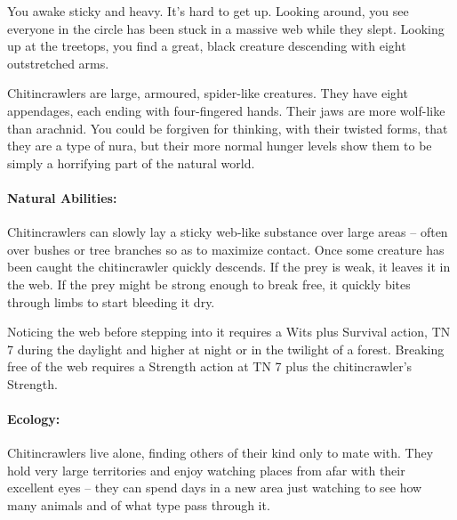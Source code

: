 \begin{multicols}{2}
\begin{itemize}
\end{itemize}


\label{chitincrawler}

\begin{boxtext}

You awake sticky and heavy.
It's hard to get up.
Looking around, you see everyone in the circle has been stuck in a massive web while they slept.
Looking up at the treetops, you find a great, black creature descending with eight outstretched arms.

\end{boxtext}

Chitincrawlers are large, armoured, spider-like creatures.
They have eight appendages, each ending with four-fingered hands.
Their jaws are more wolf-like than arachnid.
You could be forgiven for thinking, with their twisted forms, that they are a type of nura, but their more normal hunger levels show them to be simply a horrifying part of the natural world.

\chitincrawler

\paragraph{Natural Abilities:} Chitincrawlers can slowly lay a sticky web-like substance over large areas -- often over bushes or tree branches so as to maximize contact.
Once some creature has been caught the chitincrawler quickly descends.
If the prey is weak, it leaves it in the web.
If the prey might be strong enough to break free, it quickly bites through limbs to start bleeding it dry.

Noticing the web before stepping into it requires a Wits plus Survival action, TN 7 during the daylight and higher at night or in the twilight of a forest.
Breaking free of the web requires a Strength action at TN 7 plus the chitincrawler's Strength.

\paragraph{Ecology:} Chitincrawlers live alone, finding others of their kind only to mate with.
They hold very large territories and enjoy watching places from afar with their excellent eyes -- they can spend days in a new area just watching to see how many animals and of what type pass through it.


\end{multicols}
